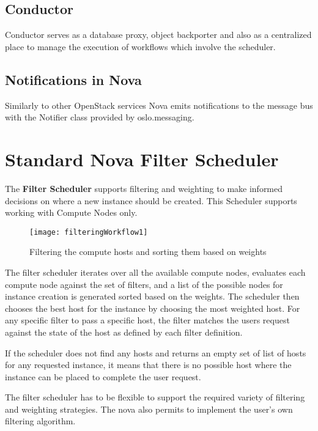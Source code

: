 \subsection{Conductor}\label{ssec:novaconductor}
Conductor serves as a database proxy, object backporter and also as a centralized place to manage the execution of workflows which involve the scheduler.

\subsection{Notifications in Nova}\label{ssec:novanotifications}
Similarly to other OpenStack services Nova emits notifications to the message bus with the Notifier class provided by oslo.messaging.

\section{Standard Nova Filter Scheduler}\label{sec:novafilterschedulerdetailed}
The \textbf{Filter Scheduler} supports filtering and weighting to make informed decisions on where a new instance should be created.
This Scheduler supports working with Compute Nodes only.
\begin{figure}[H]
	\begin{center}
		\texttt{[image: filteringWorkflow1]}
		\caption{Filtering the compute hosts and sorting them based on weights\cite{OpenStack:filteringworkflow1}}\label{fig:filteringWorkflow1}
	\end{center}
	\vspace{-10pt}
\end{figure}
The filter scheduler iterates over all the available compute nodes, evaluates each compute node against the set of filters, and a list of the possible nodes for instance creation is generated sorted based on the weights.
The scheduler then chooses the best host for the instance by choosing the most weighted host. For any specific filter to pass a specific host, the filter matches the users request against the state of the host as defined by each filter definition.

If the scheduler does not find any hosts and returns an empty set of list of hosts for any requested instance, it means that there is no possible host where the instance can be placed to complete the user request.

The filter scheduler has to be flexible to support the required variety of filtering and weighting strategies. The nova also permits to implement the user's own filtering algorithm.

